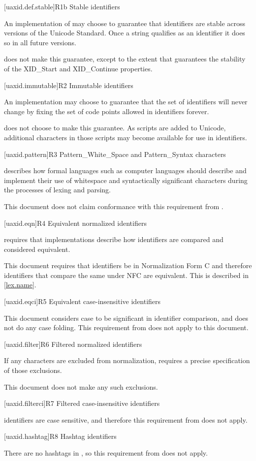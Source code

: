 [uaxid.def.stable]{R1b Stable identifiers}

\pnum
An implementation of  may choose to guarantee
that identifiers are stable across versions of the Unicode Standard.
Once a string qualifies as an identifier it does so in all future versions.

\pnum
\Cpp{} does not make this guarantee,
except to the extent that  guarantees
the stability of the XID_Start and XID_Continue properties.

[uaxid.immutable]{R2 Immutable identifiers}

\pnum
An implementation may choose to guarantee that
the set of identifiers will never change
by fixing the set of code points allowed in identifiers forever.

\pnum
\Cpp{} does not choose to make this guarantee.
As scripts are added to Unicode,
additional characters in those scripts may become available
for use in identifiers.

[uaxid.pattern]{R3 Pattern_White_Space and Pattern_Syntax characters}

\pnum
{} describes how formal languages
such as computer languages should describe and implement
their use of whitespace and syntactically significant characters
during the processes of lexing and parsing.

\pnum
This document does not claim conformance with this requirement from .

[uaxid.eqn]{R4 Equivalent normalized identifiers}

\pnum
{} requires that implementations describe
how identifiers are compared and considered equivalent.

\pnum
This document requires that identifiers be in Normalization Form C and
therefore identifiers that compare the same under NFC are equivalent.
This is described in \ref{lex.name}.

[uaxid.eqci]{R5 Equivalent case-insensitive identifiers}

\pnum
This document considers case to be significant in identifier comparison, and
does not do any case folding.
This requirement from  does not apply to this document.

[uaxid.filter]{R6 Filtered normalized identifiers}

\pnum
If any characters are excluded from normalization,
 requires a precise specification of those exclusions.

\pnum
This document does not make any such exclusions.

[uaxid.filterci]{R7 Filtered case-insensitive identifiers}

\pnum
\Cpp{} identifiers are case sensitive, and
therefore this requirement from  does not apply.

[uaxid.hashtag]{R8 Hashtag identifiers}

\pnum
There are no hashtags in \Cpp{}, so this requirement from  does not apply.
